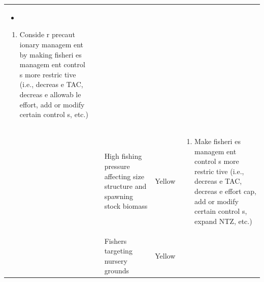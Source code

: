 \documentclass[]{book}
\providecommand{\tightlist}{%
  \setlength{\itemsep}{0pt}\setlength{\parskip}{0pt}}
\begin{document}
\begin{longtable}[]{@{}lllll@{}}
\begin{minipage}[t]{0.19\columnwidth}
\begin{itemize}
\item
\end{itemize}

\begin{enumerate}
\def\labelenumi{\arabic{enumi}.}
\setcounter{enumi}{1}
\tightlist
\item
  Conside r precaut ionary managem ent by making fisheri es managem ent
  control s more restric tive (i.e., decreas e TAC, decreas e allowab le
  effort, add or modify certain control s, etc.)
\end{enumerate}\strut
\end{minipage}\tabularnewline
\begin{minipage}[t]{0.19\columnwidth}\raggedright\strut
\strut
\end{minipage} & \begin{minipage}[t]{0.19\columnwidth}\raggedright\strut
\strut
\end{minipage} & \begin{minipage}[t]{0.19\columnwidth}\raggedright\strut
High fishing pressure affecting size structure and spawning stock
biomass\strut
\end{minipage} & \begin{minipage}[t]{0.19\columnwidth}\raggedright\strut
Yellow\strut
\end{minipage} & \begin{minipage}[t]{0.19\columnwidth}\raggedright\strut
\begin{enumerate}
\def\labelenumi{\arabic{enumi}.}
\tightlist
\item
  Make fisheri es managem ent control s more restric tive (i.e., decreas
  e TAC, decreas e effort cap, add or modify certain control s, expand
  NTZ, etc.)
\end{enumerate}\strut
\end{minipage}\tabularnewline
\begin{minipage}[t]{0.19\columnwidth}\raggedright\strut
\strut
\end{minipage} & \begin{minipage}[t]{0.19\columnwidth}\raggedright\strut
\strut
\end{minipage} & \begin{minipage}[t]{0.19\columnwidth}\raggedright\strut
Fishers targeting nursery grounds\strut
\end{minipage} & \begin{minipage}[t]{0.19\columnwidth}\raggedright\strut
Yellow\strut
\end{minipage} & \begin{minipage}[t]{0.19\columnwidth}\raggedright\strut

\end{minipage}
\end{longtable}
\end{document}
